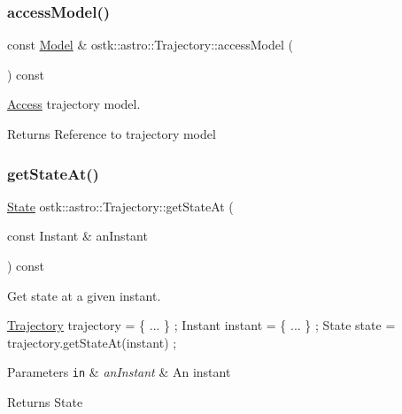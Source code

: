 \subsubsection{\texorpdfstring{access\+Model()}{accessModel()}}
{\footnotesize\ttfamily const \hyperlink{classostk_1_1astro_1_1trajectory_1_1_model}{Model} \& ostk\+::astro\+::\+Trajectory\+::access\+Model (\begin{DoxyParamCaption}{ }\end{DoxyParamCaption}) const}



\hyperlink{classostk_1_1astro_1_1_access}{Access} trajectory model. 

\begin{DoxyReturn}{Returns}
Reference to trajectory model 
\end{DoxyReturn}
\mbox{\label{classostk_1_1astro_1_1_trajectory_a0814d622d4bfb55cedb3d8eafd39f640}} 
\subsubsection{\texorpdfstring{get\+State\+At()}{getStateAt()}}
{\footnotesize\ttfamily \hyperlink{classostk_1_1astro_1_1trajectory_1_1_state}{State} ostk\+::astro\+::\+Trajectory\+::get\+State\+At (\begin{DoxyParamCaption}\item[{const Instant \&}]{an\+Instant }\end{DoxyParamCaption}) const}



Get state at a given instant. 


\begin{DoxyCode}
\hyperlink{classostk_1_1astro_1_1_trajectory_a9333200bd6afed5aef4f5aad8a2a8e84}{Trajectory} trajectory = \{ ... \} ;
Instant instant = \{ ... \} ;
State state = trajectory.getStateAt(instant) ;
\end{DoxyCode}



\begin{DoxyParams}[1]{Parameters}
\mbox{\tt in}  & {\em an\+Instant} & An instant \\
\hline
\end{DoxyParams}
\begin{DoxyReturn}{Returns}
State 
\end{DoxyReturn}
\mbox{\label{classostk_1_1astro_1_1_trajectory_a31f02515d567ac57c8d5e06d47da08a8}} 
